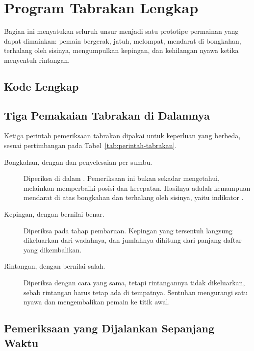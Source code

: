 \section{Program Tabrakan Lengkap}
\label{sec:program-tabrakan}

Bagian ini menyatukan seluruh unsur menjadi satu prototipe permainan yang dapat
dimainkan: pemain bergerak, jatuh, melompat, mendarat di bongkahan, terhalang
oleh sisinya, mengumpulkan kepingan, dan kehilangan nyawa ketika menyentuh
rintangan.

\subsection{Kode Lengkap}


\subsection{Tiga Pemakaian Tabrakan di Dalamnya}

Ketiga perintah pemeriksaan tabrakan dipakai untuk keperluan
yang berbeda, sesuai pertimbangan pada Tabel~\ref{tab:perintah-tabrakan}.

\begin{description}
  \item[Bongkahan, dengan  dan penyelesaian per sumbu.]
        Diperiksa di dalam . Pemeriksaan ini bukan sekadar
        mengetahui, melainkan memperbaiki posisi dan kecepatan. Hasilnya
        adalah kemampuan mendarat di atas bongkahan dan terhalang oleh
        sisinya, yaitu indikator .
  \item[Kepingan, dengan  bernilai benar.]
        Diperiksa pada tahap pembaruan. Kepingan yang tersentuh langsung
        dikeluarkan dari wadahnya, dan jumlahnya dihitung dari panjang daftar
        yang dikembalikan.
  \item[Rintangan, dengan  bernilai salah.]
        Diperiksa dengan cara yang sama, tetapi rintangannya tidak
        dikeluarkan, sebab rintangan harus tetap ada di tempatnya. Sentuhan
        mengurangi satu nyawa dan mengembalikan pemain ke titik awal.
\end{description}

\subsection{Pemeriksaan yang Dijalankan Sepanjang Waktu}

